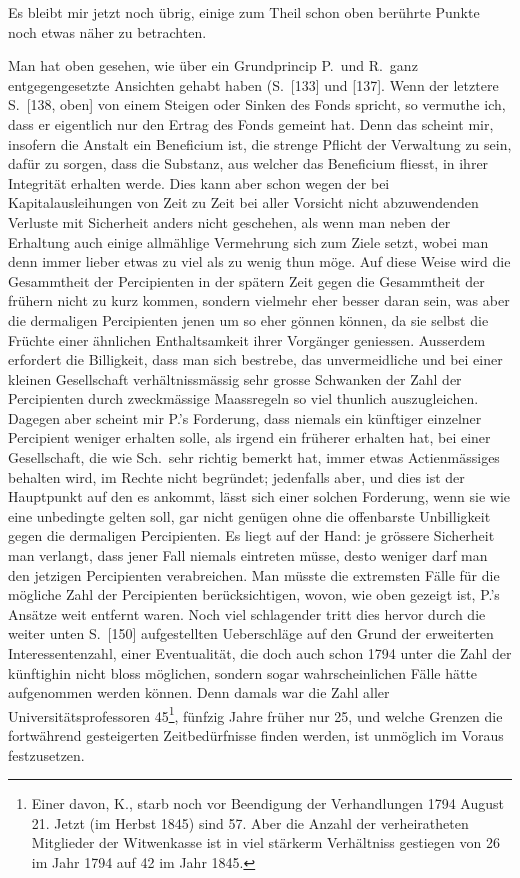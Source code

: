 \documentclass[12pt,a4paper]{article}
\begin{document}
Es bleibt mir jetzt noch \"ubrig, einige zum Theil schon oben ber\"uhrte Punkte noch etwas n\"aher zu betrachten.

Man hat oben gesehen, wie \"uber ein Grundprincip P.\ und R.\ ganz entgegengesetzte Ansichten gehabt haben (S.\ [133] und [137]. Wenn der letztere S.\ [138, oben] von einem Steigen oder Sinken des Fonds spricht, so vermuthe ich, dass er eigentlich nur den Ertrag des Fonds gemeint hat. Denn das scheint mir, insofern die Anstalt ein Beneficium ist, die strenge Pflicht der Verwaltung zu sein, daf\"ur zu sorgen, dass die Substanz, aus welcher das Beneficium fliesst, in ihrer Integrit\"at erhalten werde. Dies kann aber schon wegen der bei Kapitalausleihungen von Zeit zu Zeit bei aller Vorsicht nicht abzuwendenden Verluste mit Sicherheit anders nicht geschehen, als wenn man neben der Erhaltung auch einige allm\"ahlige Vermehrung sich zum Ziele setzt, wobei man denn immer lieber etwas zu viel als zu wenig thun m\"oge. Auf diese Weise wird die Gesammtheit der Percipienten in der sp\"atern Zeit gegen die Gesammtheit der fr\"uhern nicht zu kurz kommen, sondern vielmehr eher besser daran sein, was aber die dermaligen Percipienten jenen um so eher g\"onnen k\"onnen, da sie selbst die Fr\"uchte einer \"ahnlichen Enthaltsamkeit ihrer Vorg\"anger geniessen. Ausserdem erfordert die Billigkeit, dass man sich bestrebe, das unvermeidliche und bei einer kleinen Gesellschaft verh\"altnissm\"assig sehr grosse Schwanken der Zahl der Percipienten durch zweckm\"assige Maassregeln so viel thunlich auszugleichen. Dagegen aber scheint mir P.'s Forderung, dass niemals ein k\"unftiger einzelner Percipient weniger erhalten solle, als irgend ein fr\"uherer erhalten hat, bei einer Gesellschaft, die wie Sch.\ sehr richtig bemerkt hat, immer etwas Actienm\"assiges behalten wird, im Rechte nicht begr\"undet; jedenfalls aber, und dies ist der Hauptpunkt auf den es ankommt, l\"asst sich einer solchen Forderung, wenn sie wie eine unbedingte gelten soll, gar nicht gen\"ugen ohne die offenbarste Unbilligkeit gegen die dermaligen Percipienten. Es liegt auf der Hand: je gr\"ossere Sicherheit man verlangt, dass jener Fall niemals eintreten m\"usse, desto weniger darf man den jetzigen Percipienten verabreichen. Man m\"usste die extremsten F\"alle f\"ur die m\"ogliche Zahl der Percipienten ber\"ucksichtigen, wovon, wie oben gezeigt ist, P.'s Ans\"atze weit entfernt waren. Noch viel schlagender tritt dies hervor durch die weiter unten S.\ [150] aufgestellten Ueberschl\"age auf den Grund der erweiterten Interessentenzahl, einer Eventualit\"at, die doch auch schon 1794 unter die Zahl der k\"unftighin nicht bloss m\"oglichen, sondern sogar wahrscheinlichen F\"alle h\"atte aufgenommen werden k\"onnen. Denn damals war die Zahl aller Universit\"atsprofessoren 45\footnote{Einer davon, K., starb noch vor Beendigung der Verhandlungen 1794 August 21. Jetzt (im Herbst 1845) sind 57. Aber die Anzahl der verheiratheten Mitglieder der Witwenkasse ist in viel st\"arkerm Verh\"altniss gestiegen von 26 im Jahr 1794 auf 42 im Jahr 1845.}, f\"unfzig Jahre fr\"uher nur 25, und welche Grenzen die fortw\"ahrend gesteigerten Zeitbed\"urfnisse finden werden, ist unm\"oglich im Voraus festzusetzen.
\end{document}
